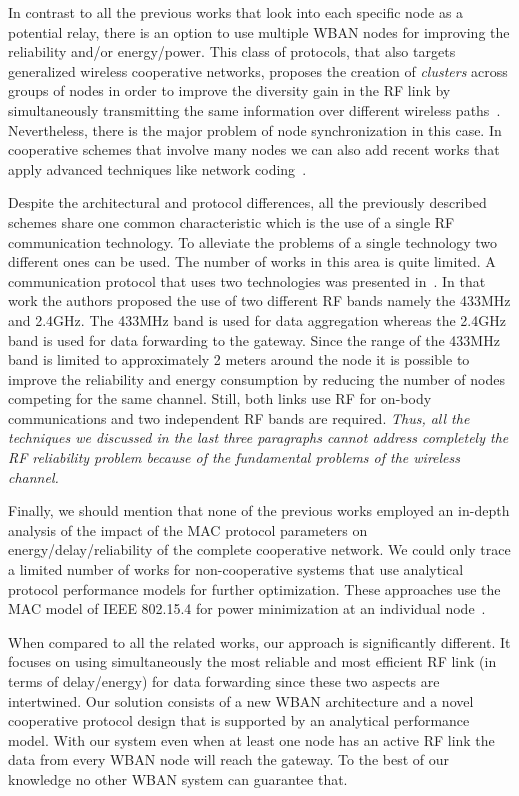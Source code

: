 \documentclass[10pt]{IEEEtran}
\begin{document}
In contrast to all the previous works that look into each specific node as a potential relay, there is an option to use multiple WBAN nodes for improving the reliability and/or energy/power. This class of protocols, that also targets generalized wireless cooperative networks, proposes the creation of \emph{clusters} across groups of nodes in order to improve the diversity gain in the RF link by simultaneously transmitting the same information over different wireless paths~\cite{sadek05}. Nevertheless, there is the major problem of node synchronization in this case.
In cooperative schemes that involve many nodes we can also add recent works that apply advanced techniques like network coding~\cite{arrobo11,zhang12}.

Despite the architectural and protocol differences, all the previously described schemes share one common characteristic which is the use of a single RF communication technology. To alleviate the problems of a single technology two different ones can be used. The number of works in this area is quite limited. A communication protocol that uses two technologies was presented in~\cite{tlc}. In that work the authors proposed the use of two different RF bands namely the 433MHz and 2.4GHz. The 433MHz band is used for data aggregation whereas the 2.4GHz band is used for data forwarding to the gateway. Since the range of the 433MHz band is limited to approximately 2 meters around the node it is possible to improve the reliability and energy consumption by reducing the number of nodes competing for the same channel. Still, both links use RF for on-body communications and two independent RF bands are required. \emph{Thus, all the techniques we discussed in the last three paragraphs cannot address completely the RF reliability problem because of the fundamental problems of the wireless channel.}


Finally, we should mention that none of the previous works employed an in-depth analysis of the impact of the MAC protocol parameters on energy/delay/reliability of the complete cooperative network. We could only trace a limited number of works for non-cooperative systems that use analytical protocol performance models for further optimization. These approaches use the MAC model of IEEE 802.15.4 for power minimization at an individual node~\cite{secon09-802154-mac-modelling-opt,ma04}.

When compared to all the related works, our approach is significantly different. It focuses on using simultaneously the most reliable and most efficient RF link (in terms of delay/energy) for data forwarding since these two aspects are intertwined. Our solution consists of a new WBAN architecture and a novel cooperative protocol design that is supported by an analytical performance model. With our system even when at least one node has an active RF link the data from every WBAN node will reach the gateway. To the best of our knowledge no other WBAN system can guarantee that.
\end{document}
